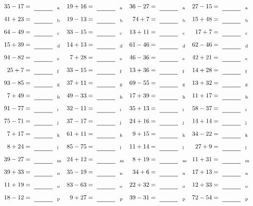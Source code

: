 \documentclass
[
  draft    = true,
  fontsize = 11pt,
  parskip  = half-
]
{scrartcl}
\begin{document}
\clearpage
\begin{align*}
    \pline{35-17}&=\rline{a}
  & \pline{19+16}&=\rline{a}
  & \pline{36-27}&=\rline{a}
  & \pline{27-15}&=\rline{a} \\[1ex]
    \pline{41+23}&=\rline{b}
  & \pline{19-13}&=\rline{b}
  & \pline{74+7}&=\rline{b}
  & \pline{15+48}&=\rline{b} \\[1ex]
    \pline{64-49}&=\rline{c}
  & \pline{33-15}&=\rline{c}
  & \pline{13+11}&=\rline{c}
  & \pline{17+7}&=\rline{c} \\[1ex]
    \pline{15+39}&=\rline{d}
  & \pline{14+13}&=\rline{d}
  & \pline{61-46}&=\rline{d}
  & \pline{62-46}&=\rline{d} \\[1ex]
    \pline{94-82}&=\rline{e}
  & \pline{7+28}&=\rline{e}
  & \pline{46-36}&=\rline{e}
  & \pline{42+21}&=\rline{e} \\[1ex]
    \pline{25+7}&=\rline{f}
  & \pline{33-15}&=\rline{f}
  & \pline{13+36}&=\rline{f}
  & \pline{14+28}&=\rline{f} \\[1ex]
    \pline{93-85}&=\rline{g}
  & \pline{37+11}&=\rline{g}
  & \pline{69-55}&=\rline{g}
  & \pline{13+32}&=\rline{g} \\[1ex]
    \pline{7+49}&=\rline{h}
  & \pline{49-33}&=\rline{h}
  & \pline{17+39}&=\rline{h}
  & \pline{11+17}&=\rline{h} \\[1ex]
    \pline{91-77}&=\rline{i}
  & \pline{32-11}&=\rline{i}
  & \pline{35+13}&=\rline{i}
  & \pline{58-37}&=\rline{i} \\[1ex]
    \pline{75-71}&=\rline{j}
  & \pline{37-17}&=\rline{j}
  & \pline{24+16}&=\rline{j}
  & \pline{14+14}&=\rline{j} \\[1ex]
    \pline{7+17}&=\rline{k}
  & \pline{61+11}&=\rline{k}
  & \pline{9+15}&=\rline{k}
  & \pline{34-22}&=\rline{k} \\[1ex]
    \pline{8+24}&=\rline{l}
  & \pline{85-75}&=\rline{l}
  & \pline{11+14}&=\rline{l}
  & \pline{27+9}&=\rline{l} \\[1ex]
    \pline{39-27}&=\rline{m}
  & \pline{24+12}&=\rline{m}
  & \pline{8+19}&=\rline{m}
  & \pline{11+31}&=\rline{m} \\[1ex]
    \pline{39+33}&=\rline{n}
  & \pline{35-19}&=\rline{n}
  & \pline{34+6}&=\rline{n}
  & \pline{17+13}&=\rline{n} \\[1ex]
    \pline{11+19}&=\rline{o}
  & \pline{83-63}&=\rline{o}
  & \pline{22+32}&=\rline{o}
  & \pline{12+33}&=\rline{o} \\[1ex]
    \pline{18-12}&=\rline{p}
  & \pline{9+27}&=\rline{p}
  & \pline{39-31}&=\rline{p}
  & \pline{72-54}&=\rline{p}
\end{align*}
\end{document}
